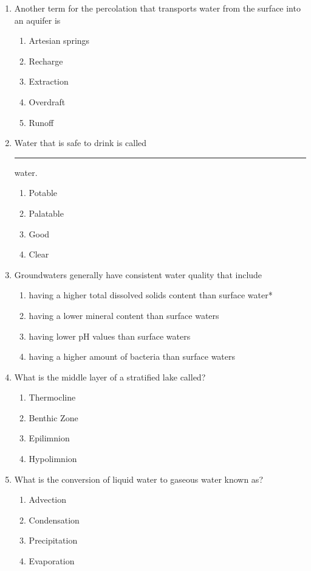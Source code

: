 \documentclass{article}
\begin{document}
\begin{enumerate}
\item Another term for the percolation that transports water from the surface into an aquifer is
\begin{enumerate}
\item Artesian springs
\item Recharge
\item Extraction
\item Overdraft
\item Runoff
\end{enumerate}

\item Water that is safe to drink is called \rule{2cm}{0.3pt} water.
\begin{enumerate}
\item Potable
\item Palatable
\item Good
\item Clear
\end{enumerate}

\item Groundwaters generally have consistent water quality that include
\begin{enumerate}
\item having a higher total dissolved solids content than surface water*
\item having a lower mineral content than surface waters
\item having lower pH values than surface waters
\item having a higher amount of bacteria than surface waters
\end{enumerate}

\item What is the middle layer of a stratified lake called?\\
\begin{enumerate}
\item Thermocline\\
\item Benthic Zone\\
\item Epilimnion\\
\item Hypolimnion
\end{enumerate}

\item  What is the conversion of liquid water to gaseous water known as?\\
\begin{enumerate}
\item Advection\\
\item Condensation\\
\item Precipitation\\
\item Evaporation
\end{enumerate}


\end{enumerate}
\end{document}
